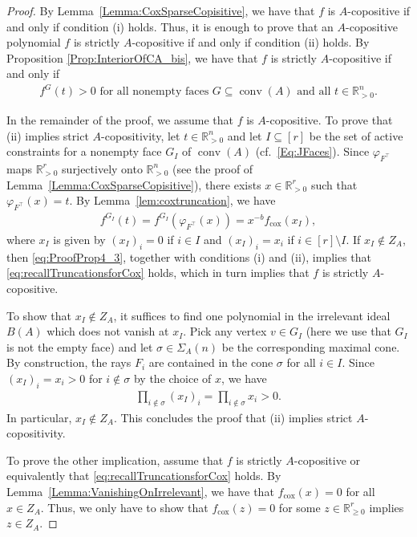 \documentclass[a4paper,11pt]{amsart}
\theoremstyle{definition}
\DeclareMathOperator{\conv}{conv}
\newcommand{\RR}{\mathbb{R}}
\newcommand{\cox}{\mathrm{cox}}
\begin{document}
\begin{proof}
By Lemma~\ref{Lemma:CoxSparseCopisitive}, we have that $f$ is $A$-copositive if and only if condition (i) holds. 
Thus, it is enough to prove that an $A$-copositive polynomial $f$ is strictly $A$-copositive if and only if condition (ii) holds. By Proposition \ref{Prop:InteriorOfCA_bis}, we have that $f$ is strictly $A$-copositive if and only if 
\begin{align}
\label{eq:recallTruncationsforCox}
f^{G}(t)>0\text{ for all nonempty faces }G \subseteq \conv(A) \text{ and all }t\in\RR_{>0}^n.
    \end{align}


In the remainder of the proof, we assume that $f$ is $A$-copositive.
To prove that (ii) implies strict $A$-copositivity, let $t \in \RR^n_{>0}$ and let $I \subseteq [r]$ be the set of active constraints for a nonempty face $G_I$ of $\conv(A)$  (cf.~\eqref{Eq:JFaces}).
Since $\varphi_{F^\top}$ maps $\RR_{>0}^r$ surjectively onto $\RR_{>0}^n$ (see the proof of Lemma~\ref{Lemma:CoxSparseCopisitive}), there exists $x\in \RR_{>0}^r$ such that $\varphi_{F^\top}(x)=t$.
By Lemma~\ref{lem:coxtruncation}, we have
\begin{align}
\label{eq:ProofProp4_3}
          f^{G_I}(t)=f^{G_I}(\varphi_{F^\top}(x))=x^{-b}f_{\cox}(x_I),
        \end{align}
        where $x_I$ is given by
        $(x_I)_i = 0$ if $i\in I$  and $(x_I)_i = x_i$ if $i \in [r] \setminus I$.
If $x_I \notin Z_A$, then \eqref{eq:ProofProp4_3}, together with conditions (i) and (ii), implies that \eqref{eq:recallTruncationsforCox} holds, which in turn implies that $f$ is strictly $A$-copositive.

To show that $x_I\notin Z_A$, it suffices to find one polynomial in the irrelevant ideal $B(A)$ which does not vanish at $x_I$. Pick any vertex $v\in G_I$ (here we use that $G_I$ is not the empty face) and let $\sigma \in \Sigma_A(n)$ be the corresponding maximal cone.
By construction, the rays $F_i$ are contained in the cone $\sigma$ for all $i \in I$.
Since $(x_I)_i = x_i > 0$ for $i  \notin \sigma$ by the choice of $x$, we have
\begin{align*}
        \prod_{i\notin \sigma}(x_I)_i=\prod_{i\notin \sigma}x_i>0.
    \end{align*}
    In particular, $x_I\notin Z_A$. This concludes the proof that (ii) implies strict $A$-copositivity.
    
     To prove the other implication, assume that $f$ is strictly $A$-copositive or equivalently that \eqref{eq:recallTruncationsforCox} holds.
     By Lemma~\ref{Lemma:VanishingOnIrrelevant}, we have that $f_\cox(x) = 0$ for all $x \in Z_A$.
     Thus, we only have to show that $f_\cox(z)=0$ for some $z\in \RR_{\geq 0}^r$ implies $z\in Z_A$. 


\end{proof}
\end{document}
